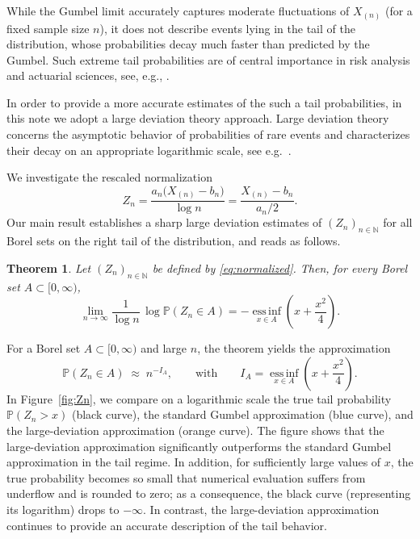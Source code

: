 \documentclass[12pt]{article}%
\newtheorem{theorem}{Theorem}
\newcommand{\PP}{\mathbb{P}}
\begin{document}
While the Gumbel limit accurately captures  moderate fluctuations of
$X_{(n)}$ (for a fixed sample size $n$), it does not describe events lying  in the tail of the distribution,
whose probabilities decay much faster than predicted by the Gumbel. Such extreme tail probabilities are of central importance in risk analysis and actuarial sciences, see, e.g., \cite{embrechts,mcneil}.

In order to provide a more accurate estimates of the such a tail probabilities, in this note we adopt a large deviation theory approach. Large deviation theory concerns the asymptotic behavior of probabilities of rare events and characterizes their decay on an appropriate logarithmic scale, see e.g.~\cite{dembo}.

We investigate the rescaled normalization
\begin{equation}\label{eq:normalized}
Z_n
=
\frac{a_n\bigl(X_{(n)} - b_n\bigr)}{\log n}
=
\frac{X_{(n)} - b_n}{a_n/2}.
\end{equation}
 Our main result establishes a sharp large
deviation estimates of $(Z_n)_{n\in\mathbb{N}}$ for all Borel sets  on the right tail of the distribution, and reads as follows. 


\begin{theorem}\label{thm:main}
Let $(Z_n)_{n\in\mathbb{N}}$ be defined by \eqref{eq:normalized}. Then, for every Borel set
$A\subset [0,\infty)$,
\begin{equation}\label{eq:LDP}
\lim_{n\to\infty}
\frac{1}{\log n}\,
\log \PP(Z_n\in A)
=
- \operatorname*{ess\,inf}_{x\in A}
\left( x + \frac{x^{2}}{4} \right).
\end{equation}
\end{theorem}

For a Borel set $A \subset [0,\infty)$ and large $n$, the theorem
yields the  approximation
\[
\mathbb{P}(Z_n \in A)
\;\approx\;
n^{-I_A},
\qquad
\text{with}
\qquad
I_A
=
\operatorname*{ess\,inf}_{x\in A}
\left( x + \frac{x^{2}}{4} \right).
\]
In Figure~\ref{fig:Zn}, we compare on a logarithmic
scale the true tail probability $\mathbb{P}(Z_n > x)$ (black curve), the standard Gumbel
approximation (blue curve), and the large-deviation approximation (orange curve). The figure shows that the large-deviation approximation significantly outperforms the standard Gumbel approximation in the tail regime. In addition, for sufficiently large
values of $x$, the true probability becomes so small that numerical evaluation
suffers from underflow and is rounded to zero; as a consequence, the black curve
(representing its logarithm) drops to $-\infty$. In contrast, the
large-deviation approximation  continues to provide an accurate description of the tail behavior.
\end{document}
